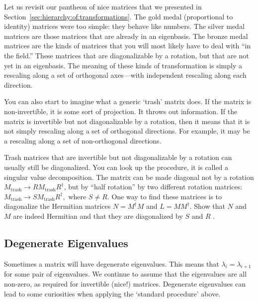 \documentclass[12pt, oneside]{report}    %
\begin{document}
\begin{bigidea}
Let us revisit our pantheon of nice matrices that we presented in Section~\ref{sec:hierarchy:of:transformations}. The gold medal (proportional to identity) matrices were too simple: they behave like numbers. The silver medal matrices are those matrices that are already in an eigenbasis. The bronze medal matrices are the kinds of matrices that you will most likely have to deal with ``in the field.'' These matrices that are diagonalizable by a rotation, but that are not yet in an eigenbasis. The meaning of these kinds of transformation is simply a rescaling along a set of orthogonal axes---with independent rescaling along each direction. 

You can also start to imagine what a generic `trash' matrix does. If the matrix is non-invertible, it is some sort of projection. It throws out information. If the matrix is invertible but not diagonalizable by a rotation, then it means that it is not simply rescaling along a set of orthogonal directions. For example, it may be a rescaling along a set of non-orthogonal directions. 
\end{bigidea}

\begin{exercise}
Trash matrices that are invertible but not diagonalizable by a rotation can usually still be diagonalized. You can look up the procedure, it is called a singular value decomposition. The matrix can be made diagonal not by a rotation $M_\text{trash}\to RM_\text{trash}R^\dag$, but by ``half rotation'' by two different rotation matrices: $M_\text{trash} \to SM_\text{trash} R^\dag,$ where $S \neq R$. One way to find these matrices is to diagonalize the Hermitian matrices $N=M^\dag M$ and $L = M M^\dag$. Show that $N$ and $M$ are indeed Hermitian and that they are diagonalized by $S$ and $R$ .
\end{exercise}






\subsection{Degenerate Eigenvalues}

Sometimes a matrix will have degenerate eigenvalues. This means that $\lambda_i = \lambda_{i+1}$ for some pair of eigenvalues. We continue to assume that the eigenvalues are all non-zero, as required for invertible (nice!) matrices.  Degenerate eigenvalues can lead to some curiosities when applying the `standard procedure' above. 
\end{document}

